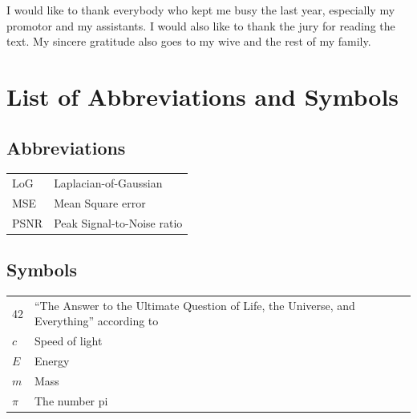\documentclass[master=ebin]{kulemt}
\begin{document}
\begin{preface}
  I would like to thank everybody who kept me busy the last year,
  especially my promotor and my assistants. I would also like to thank the
  jury for reading the text. My sincere gratitude also goes to my wive and
  the rest of my family.
\end{preface}

\tableofcontents

\begin{abstract}
  The \texttt{abstract} environment contains a more extensive overview of
  the work. But it should be limited to one page.

  \lipsum[1]
\end{abstract}

\listoffiguresandtables
\chapter{List of Abbreviations and Symbols}
\section*{Abbreviations}
\begin{flushleft}
  \renewcommand{\arraystretch}{1.1}
  \begin{tabularx}{\textwidth}{@{}p{12mm}X@{}}
    LoG   & Laplacian-of-Gaussian \\
    MSE   & Mean Square error \\
    PSNR  & Peak Signal-to-Noise ratio \\
  \end{tabularx}
\end{flushleft}
\section*{Symbols}
\begin{flushleft}
  \renewcommand{\arraystretch}{1.1}
  \begin{tabularx}{\textwidth}{@{}p{12mm}X@{}}
    42    & ``The Answer to the Ultimate Question of Life, the Universe,
            and Everything'' according to \cite{h2g2} \\
    $c$   & Speed of light \\
    $E$   & Energy \\
    $m$   & Mass \\
    $\pi$ & The number pi \\
  \end{tabularx}
\end{flushleft}
\end{document}
